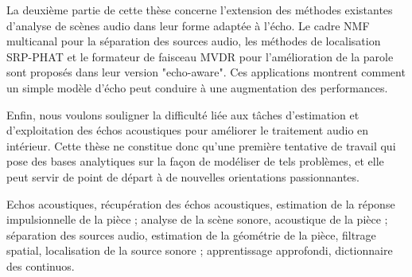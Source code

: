{    \mynewline
    La deuxième partie de cette thèse concerne l'extension des méthodes existantes d'analyse de scènes audio dans leur forme adaptée à l'écho.
    Le cadre NMF multicanal pour la séparation des sources audio, les méthodes de localisation SRP-PHAT et le formateur de faisceau MVDR pour l'amélioration de la parole
    sont proposés dans leur version "echo-aware". Ces applications montrent comment un simple modèle d'écho peut conduire à une augmentation des performances.

    \noindent Enfin, nous voulons souligner la difficulté liée aux tâches d'estimation et d'exploitation des échos acoustiques pour améliorer le traitement audio en intérieur.
    Cette thèse ne constitue donc qu'une première tentative de travail qui pose des bases analytiques sur la façon de modéliser de tels problèmes, et elle peut servir de point de départ à de nouvelles orientations passionnantes.

    Echos acoustiques, récupération des échos acoustiques, estimation de la réponse impulsionnelle de la pièce ;
    analyse de la scène sonore, acoustique de la pièce ;
    séparation des sources audio, estimation de la géométrie de la pièce, filtrage spatial, localisation de la source sonore ;
    apprentissage approfondi, dictionnaire des continuos.
}